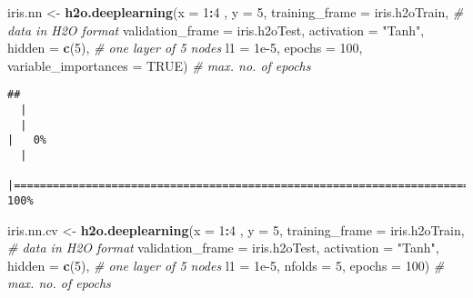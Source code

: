 \documentclass[
]{book}
\newenvironment{Shaded}{\begin{snugshade}}{\end{snugshade}}
\newcommand{\CommentTok}[1]{\textcolor[rgb]{0.56,0.35,0.01}{\textit{#1}}}
\newcommand{\DataTypeTok}[1]{\textcolor[rgb]{0.13,0.29,0.53}{#1}}
\newcommand{\DecValTok}[1]{\textcolor[rgb]{0.00,0.00,0.81}{#1}}
\newcommand{\FloatTok}[1]{\textcolor[rgb]{0.00,0.00,0.81}{#1}}
\newcommand{\KeywordTok}[1]{\textcolor[rgb]{0.13,0.29,0.53}{\textbf{#1}}}
\newcommand{\NormalTok}[1]{#1}
\newcommand{\OperatorTok}[1]{\textcolor[rgb]{0.81,0.36,0.00}{\textbf{#1}}}
\newcommand{\OtherTok}[1]{\textcolor[rgb]{0.56,0.35,0.01}{#1}}
\newcommand{\StringTok}[1]{\textcolor[rgb]{0.31,0.60,0.02}{#1}}
\begin{document}
\begin{Shaded}
\begin{Highlighting}[]
\NormalTok{iris.nn <-}\StringTok{ }\KeywordTok{h2o.deeplearning}\NormalTok{(}\DataTypeTok{x =} \DecValTok{1}\OperatorTok{:}\DecValTok{4}\NormalTok{ ,}
                            \DataTypeTok{y =} \DecValTok{5}\NormalTok{, }
                            \DataTypeTok{training_frame =}\NormalTok{ iris.h2oTrain, }\CommentTok{# data in H2O format}
                            \DataTypeTok{validation_frame =}\NormalTok{ iris.h2oTest,}
                            \DataTypeTok{activation =} \StringTok{"Tanh"}\NormalTok{,}
                            \DataTypeTok{hidden =} \KeywordTok{c}\NormalTok{(}\DecValTok{5}\NormalTok{), }\CommentTok{# one layer of 5 nodes}
                            \DataTypeTok{l1 =} \FloatTok{1e-5}\NormalTok{,}
                            \DataTypeTok{epochs =} \DecValTok{100}\NormalTok{, }\DataTypeTok{variable_importances =} \OtherTok{TRUE}\NormalTok{) }\CommentTok{# max. no. of epochs}
\end{Highlighting}
\end{Shaded}

\begin{verbatim}
## 
  |                                                                            
  |                                                                      |   0%
  |                                                                            
  |======================================================================| 100%
\end{verbatim}

\begin{Shaded}
\begin{Highlighting}[]
\NormalTok{iris.nn.cv <-}\StringTok{ }\KeywordTok{h2o.deeplearning}\NormalTok{(}\DataTypeTok{x =} \DecValTok{1}\OperatorTok{:}\DecValTok{4}\NormalTok{ ,}
                            \DataTypeTok{y =} \DecValTok{5}\NormalTok{, }
                            \DataTypeTok{training_frame =}\NormalTok{ iris.h2oTrain, }\CommentTok{# data in H2O format}
                            \DataTypeTok{validation_frame =}\NormalTok{ iris.h2oTest,}
                            \DataTypeTok{activation =} \StringTok{"Tanh"}\NormalTok{,}
                            \DataTypeTok{hidden =} \KeywordTok{c}\NormalTok{(}\DecValTok{5}\NormalTok{), }\CommentTok{# one layer of 5 nodes}
                            \DataTypeTok{l1 =} \FloatTok{1e-5}\NormalTok{,}
                            \DataTypeTok{nfolds =} \DecValTok{5}\NormalTok{,}
                            \DataTypeTok{epochs =} \DecValTok{100}\NormalTok{) }\CommentTok{# max. no. of epochs}
\end{Highlighting}
\end{Shaded}
\end{document}
